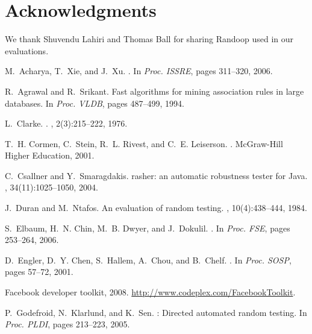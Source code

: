 \documentclass{sig-alternate}
\begin{document}
\section*{Acknowledgments}

We thank Shuvendu Lahiri and Thomas Ball for sharing Randoop used in our evaluations.


\begin{thebibliography}{10}

M.~Acharya, T.~Xie, and J.~Xu.
.
\newblock In {\em Proc. ISSRE}, pages 311--320, 2006.

R.~Agrawal and R.~Srikant.
\newblock Fast algorithms for mining association rules in large databases.
\newblock In {\em Proc. VLDB}, pages 487--499, 1994.

L.~Clarke.
.
, 2(3):215--222, 1976.

T.~H. Cormen, C.~Stein, R.~L. Rivest, and C.~E. Leiserson.
.
\newblock McGraw-Hill Higher Education, 2001.

C.~Csallner and Y.~Smaragdakis.
rasher: an automatic robustness tester for {J}ava.
, 34(11):1025--1050, 2004.

J.~Duran and M.~Ntafos.
\newblock An evaluation of random testing.
, 10(4):438--444, 1984.

S.~Elbaum, H.~N. Chin, M.~B. Dwyer, and J.~Dokulil.
.
\newblock In {\em Proc. FSE}, pages 253--264, 2006.

D.~Engler, D.~Y. Chen, S.~Hallem, A.~Chou, and B.~Chelf.
.
\newblock In {\em Proc. SOSP}, pages 57--72, 2001.

Facebook developer toolkit, 2008.
\newblock \url{http://www.codeplex.com/FacebookToolkit}.

P.~Godefroid, N.~Klarlund, and K.~Sen.
: {D}irected automated random testing.
\newblock In {\em Proc. PLDI}, pages 213--223, 2005.


\end{thebibliography}
\end{document}
